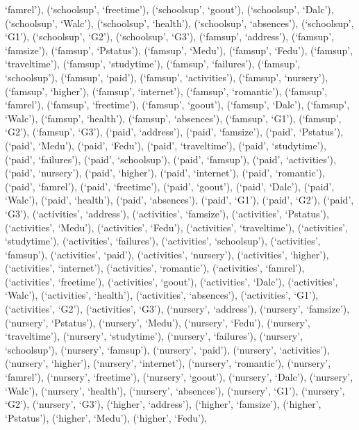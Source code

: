 \documentclass[
]{article}
\begin{document}
`famrel'), (`schoolsup', `freetime'), (`schoolsup', `goout'),
(`schoolsup', `Dalc'), (`schoolsup', `Walc'), (`schoolsup', `health'),
(`schoolsup', `absences'), (`schoolsup', `G1'), (`schoolsup', `G2'),
(`schoolsup', `G3'), (`famsup', `address'), (`famsup', `famsize'),
(`famsup', `Pstatus'), (`famsup', `Medu'), (`famsup', `Fedu'),
(`famsup', `traveltime'), (`famsup', `studytime'), (`famsup',
`failures'), (`famsup', `schoolsup'), (`famsup', `paid'), (`famsup',
`activities'), (`famsup', `nursery'), (`famsup', `higher'), (`famsup',
`internet'), (`famsup', `romantic'), (`famsup', `famrel'), (`famsup',
`freetime'), (`famsup', `goout'), (`famsup', `Dalc'), (`famsup',
`Walc'), (`famsup', `health'), (`famsup', `absences'), (`famsup', `G1'),
(`famsup', `G2'), (`famsup', `G3'), (`paid', `address'), (`paid',
`famsize'), (`paid', `Pstatus'), (`paid', `Medu'), (`paid', `Fedu'),
(`paid', `traveltime'), (`paid', `studytime'), (`paid', `failures'),
(`paid', `schoolsup'), (`paid', `famsup'), (`paid', `activities'),
(`paid', `nursery'), (`paid', `higher'), (`paid', `internet'), (`paid',
`romantic'), (`paid', `famrel'), (`paid', `freetime'), (`paid',
`goout'), (`paid', `Dalc'), (`paid', `Walc'), (`paid', `health'),
(`paid', `absences'), (`paid', `G1'), (`paid', `G2'), (`paid', `G3'),
(`activities', `address'), (`activities', `famsize'), (`activities',
`Pstatus'), (`activities', `Medu'), (`activities', `Fedu'),
(`activities', `traveltime'), (`activities', `studytime'),
(`activities', `failures'), (`activities', `schoolsup'), (`activities',
`famsup'), (`activities', `paid'), (`activities', `nursery'),
(`activities', `higher'), (`activities', `internet'), (`activities',
`romantic'), (`activities', `famrel'), (`activities', `freetime'),
(`activities', `goout'), (`activities', `Dalc'), (`activities', `Walc'),
(`activities', `health'), (`activities', `absences'), (`activities',
`G1'), (`activities', `G2'), (`activities', `G3'), (`nursery',
`address'), (`nursery', `famsize'), (`nursery', `Pstatus'), (`nursery',
`Medu'), (`nursery', `Fedu'), (`nursery', `traveltime'), (`nursery',
`studytime'), (`nursery', `failures'), (`nursery', `schoolsup'),
(`nursery', `famsup'), (`nursery', `paid'), (`nursery', `activities'),
(`nursery', `higher'), (`nursery', `internet'), (`nursery', `romantic'),
(`nursery', `famrel'), (`nursery', `freetime'), (`nursery', `goout'),
(`nursery', `Dalc'), (`nursery', `Walc'), (`nursery', `health'),
(`nursery', `absences'), (`nursery', `G1'), (`nursery', `G2'),
(`nursery', `G3'), (`higher', `address'), (`higher', `famsize'),
(`higher', `Pstatus'), (`higher', `Medu'), (`higher', `Fedu'),
\end{document}
